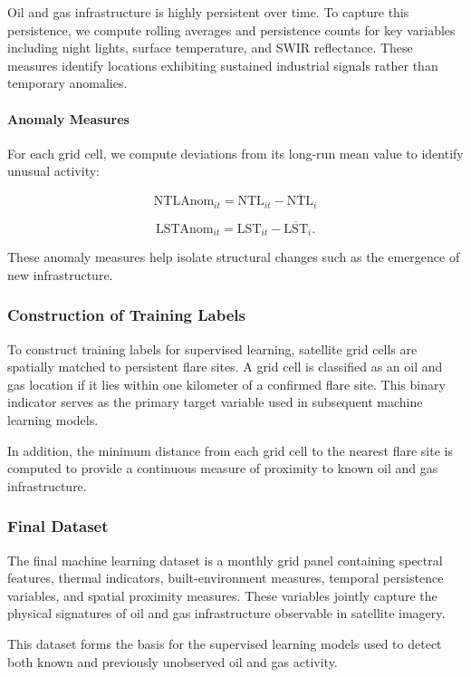 \documentclass[12pt]{article}
\begin{document}
Oil and gas infrastructure is highly persistent over time. To capture this persistence, we compute rolling averages and persistence counts for key variables including night lights, surface temperature, and SWIR reflectance. These measures identify locations exhibiting sustained industrial signals rather than temporary anomalies.

\paragraph{Anomaly Measures}

For each grid cell, we compute deviations from its long-run mean value to identify unusual activity:

\[
\text{NTLAnom}_{it} = \text{NTL}_{it} - \overline{\text{NTL}}_{i}
\]

\[
\text{LSTAnom}_{it} = \text{LST}_{it} - \overline{\text{LST}}_{i}.
\]

These anomaly measures help isolate structural changes such as the emergence of new infrastructure.

\subsubsection{Construction of Training Labels}

To construct training labels for supervised learning, satellite grid cells are spatially matched to persistent flare sites. A grid cell is classified as an oil and gas location if it lies within one kilometer of a confirmed flare site. This binary indicator serves as the primary target variable used in subsequent machine learning models.

In addition, the minimum distance from each grid cell to the nearest flare site is computed to provide a continuous measure of proximity to known oil and gas infrastructure.

\subsubsection{Final Dataset}

The final machine learning dataset is a monthly grid panel containing spectral features, thermal indicators, built-environment measures, temporal persistence variables, and spatial proximity measures. These variables jointly capture the physical signatures of oil and gas infrastructure observable in satellite imagery.

This dataset forms the basis for the supervised learning models used to detect both known and previously unobserved oil and gas activity.
\end{document}

